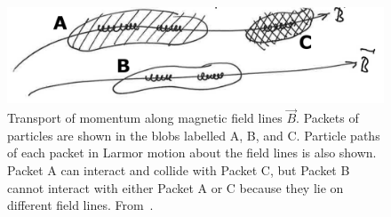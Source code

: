 \begin{figure}[h]
  \begin{center}  
    \includegraphics[width=\textwidth, angle=0.]{img/paralleltransport.png}
  \end{center}
  \caption{Transport of momentum along magnetic field lines $\vec B$. Packets of particles are shown in the blobs labelled A, B, and C. Particle paths of each packet in Larmor motion about the field lines is also shown. Packet A can interact and collide with Packet C, but Packet B cannot interact with either Packet A or C because they lie on different field lines. From~\citet{KunzBraginskii}.}
  \label{fig:bragviscosity}
\end{figure}

